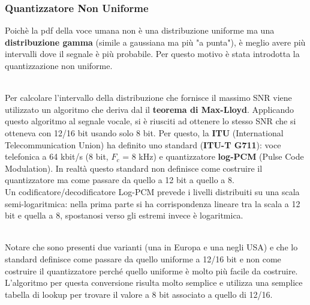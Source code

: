 \documentclass{article}
\begin{document}
			\subsubsection{Quantizzatore Non Uniforme}
				Poichè la pdf della voce umana non è una distribuzione uniforme ma una \textbf{distribuzione gamma} (simile a gaussiana ma più "a punta"), è meglio avere più intervalli dove il segnale è più probabile. Per questo motivo è stata introdotta la quantizzazione non uniforme.
				\begin{figure}[ht!]
				\end{figure}
				\\Per calcolare l'intervallo della distribuzione che fornisce il massimo SNR viene utilizzato un algoritmo che deriva dal il \textbf{teorema di Max-Lloyd}. Applicando questo algoritmo al segnale vocale, si è riusciti ad ottenere lo stesso SNR che si otteneva con 12/16 bit usando solo 8 bit. Per questo, la \textbf{ITU} (International Telecommunication Union) ha definito uno standard (\textbf{ITU-T G711}): voce telefonica a 64 kbit/s (8 bit, $F_{c}$ = 8 kHz) e quantizzatore \textbf{log-PCM} (Pulse Code Modulation). In realtà questo standard non definisce come costruire il quantizzatore ma come passare da quello a 12 bit a quello a 8.
				\\Un codificatore/decodificatore Log-PCM prevede i livelli distribuiti su una scala semi-logaritmica: nella prima parte si ha corrispondenza lineare tra la scala a 12 bit e quella a 8, spostanosi verso gli estremi invece è logaritmica.
				\begin{figure}[ht!]
				\end{figure}
				\\Notare che sono presenti due varianti (una in Europa e una negli USA) e che lo standard definisce come passare da quello uniforme a 12/16 bit e non come costruire il quantizzatore perché quello uniforme è molto più facile da costruire. L'algoritmo per questa conversione risulta molto semplice e utilizza una semplice tabella di lookup per trovare il valore a 8 bit associato a quello di 12/16.
\end{document}
